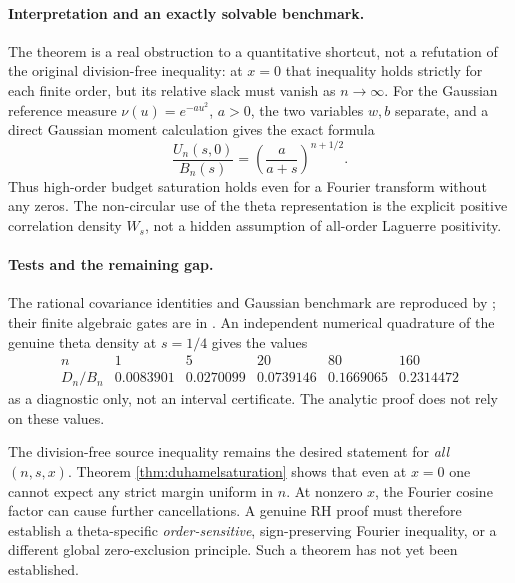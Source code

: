 \paragraph{Interpretation and an exactly solvable benchmark.}
The theorem is a real obstruction to
a quantitative shortcut, not a refutation
of the original division-free inequality:
at $x=0$ that inequality holds strictly
for each finite order, but its relative
slack must vanish as $n\to\infty$.
For the Gaussian reference measure
$\nu(u)=e^{-au^2}$, $a>0$,
the two variables $w,b$ separate,
and a direct Gaussian moment
calculation gives the exact formula
\begin{equation}
\frac{U_n(s,0)}{B_n(s)}
=\left(\frac{a}{a+s}\right)^{n+1/2}.
\label{eq:duhamelgaussian}
\end{equation}
Thus high-order budget saturation
holds even for a Fourier transform
without any zeros.
The non-circular use of the theta
representation is the explicit
positive correlation density
$W_s$, not a hidden assumption
of all-order Laguerre positivity.

\paragraph{Tests and the remaining gap.}
The rational covariance identities and
Gaussian benchmark are reproduced by
;
their finite algebraic gates are in
.
An independent numerical quadrature
of the genuine theta density at
$s=1/4$ gives the values
\[
\begin{array}{c|rrrrr}
n&1&5&20&80&160\\ \hline
D_n/B_n&
0.0083901&0.0270099&0.0739146&
0.1669065&0.2314472
\end{array}
\]
as a diagnostic only, not an interval
certificate. The analytic proof
does not rely on these values.

The division-free source inequality
remains the desired statement for
\emph{all} $(n,s,x)$. Theorem
\ref{thm:duhamelsaturation} shows that
even at $x=0$ one cannot expect any
strict margin uniform in $n$.
At nonzero $x$, the Fourier cosine
factor can cause further cancellations.
A genuine RH proof must therefore
establish a theta-specific \emph{order-sensitive},
sign-preserving Fourier inequality,
or a different global zero-exclusion
principle. Such a theorem has
not yet been established.
